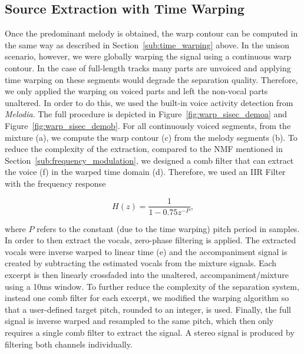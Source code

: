 \subsection{Source Extraction with Time Warping}

Once the predominant melody is obtained, the warp contour can be computed in the same way as described in Section~\ref{sub:time_warping} above.
In the unison scenario, however, we were globally warping the signal using a continuous warp contour.
In the case of full-length tracks many parts are unvoiced and applying time warping on these segments would degrade the separation quality.
Therefore, we only applied the warping on voiced parts and left the non-vocal parts unaltered.
In order to do this, we used the built-in voice activity detection from \emph{Melodia}.
The full procedure is depicted in Figure~\ref{fig:warp_sisec_demoa} and Figure~\ref{fig:warp_sisec_demob}.
For all continuously voiced segments, from the mixture (a), we compute the warp contour (c) from the melody segments (b).
To reduce the complexity of the extraction, compared to the \acs{NMF} mentioned in Section~\ref{sub:frequency_modulation}, we designed a comb filter that can extract the voice (f) in the warped time domain (d).
Therefore, we used an IIR Filter with the frequency response

\begin{equation}
  H(z) = \frac{1}{1 - 0.75z^{-P}},
\end{equation}

where \(P\) refers to the constant (due to the time warping) pitch period in samples.
In order to then extract the vocals, zero-phase filtering is applied.
The extracted vocals were inverse warped to linear time (e) and the accompaniment signal is created by subtracting the estimated vocals from the mixture signals.
Each excerpt is then linearly crossfaded into the unaltered, accompaniment/mixture using a 10ms window.
To further reduce the complexity of the separation system, instead one comb filter for each excerpt, we modified the warping algorithm so that a user-defined target pitch, rounded to an integer, is used.
Finally, the full signal is inverse warped and resampled to the same pitch, which then only requires a single comb filter to extract the signal.
A stereo signal is produced by filtering both channels individually.

